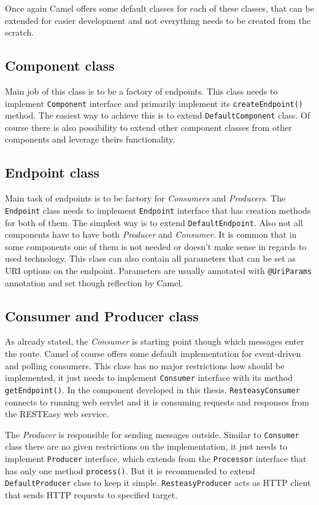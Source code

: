 \documentclass[12pt,final,oneside]{fithesis2}
\begin{document}
Once again Camel offers some default classes for each of these classes, that can be extended for easier development and not everything needs to be created from the scratch.

\subsection*{Component class}
Main job of this class is to be a factory of endpoints. This class needs to implement \texttt{Component} interface and primarily implement its \texttt{createEndpoint()} method. The easiest way to achieve this is to extend \texttt{DefaultComponent} class. Of course there is also possibility to extend other component classes from other components and leverage theirs functionality.

\subsection*{Endpoint class}
Main task of endpoints is to be factory for \textit{Consumers} and \textit{Producers}. The \texttt{Endpoint} class needs to implement \texttt{Endpoint} interface that has creation methods for both of them. The simplest way is to extend \texttt{DefaultEndpoint}. Also not all components have to have both \textit{Producer} and \textit{Consumer}. It is common that in some components one of them is not needed or doesn't make sense in regards to used technology. This class can also contain all parameters that can be set as URI options on the endpoint. Parameters are usually annotated with \texttt{@UriParams} annotation and set though reflection by Camel.

\subsection*{Consumer and Producer class}
As already stated, the \textit{Consumer} is starting point though which messages enter the route. Camel of course offers some default implementation for event-driven and polling consumers. This class has no major restrictions how should be implemented, it just needs to implement \texttt{Consumer} interface with its method \texttt{getEndpoint()}. In the component developed in this thesis, \texttt{ResteasyConsumer} connects to running web servlet and it is consuming requests and responses from the RESTEasy web service. 

The \textit{Producer} is responsible for sending messages outside. Similar to \texttt{Consumer} class there are no given restrictions on the implementation, it just needs to implement \texttt{Producer} interface, which extends from the \texttt{Processor} interface that has only one method \texttt{process()}. But it is recommended to extend \texttt{DefaultProducer} class to keep it simple. \texttt{ResteasyProducer} acts as HTTP client that sends HTTP requests to specified target.
\end{document}
